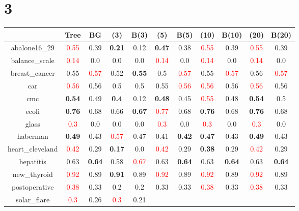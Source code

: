 \documentclass{article}%
\begin{document}
\section*{3}%
\begin{tabular}{c|cccccccccc}%
\hline%
&Tree&BG&(3)&B(3)&(5)&B(5)&(10)&B(10)&(20)&B(20)\\%
\hline%
abalone16\_29&\textcolor{red}{ 
0.55
}&0.39&\textbf{0.21}&0.12&\textbf{0.47}&0.38&\textcolor{red}{ 
0.55
}&0.39&\textcolor{red}{ 
0.55
}&0.39\\%
\hline%
balance\_scale&\textcolor{red}{ 
0.14
}&0.0&0.0&0.0&\textcolor{red}{ 
0.14
}&0.0&\textcolor{red}{ 
0.14
}&0.0&\textcolor{red}{ 
0.14
}&0.0\\%
\hline%
breast\_cancer&0.55&\textcolor{red}{ 
0.57
}&0.52&\textbf{0.55}&0.5&\textcolor{red}{ 
0.57
}&0.55&\textcolor{red}{ 
0.57
}&0.56&\textcolor{red}{ 
0.57
}\\%
\hline%
car&\textcolor{red}{ 
0.56
}&0.56&0.5&0.5&0.55&\textcolor{red}{ 
0.56
}&\textcolor{red}{ 
0.56
}&0.56&\textcolor{red}{ 
0.56
}&0.56\\%
\hline%
cmc&\textbf{0.54}&0.49&\textbf{0.4}&0.12&\textbf{0.48}&0.45&\textcolor{red}{ 
0.55
}&0.48&\textbf{0.54}&0.5\\%
\hline%
ecoli&\textbf{0.76}&0.68&0.66&\textbf{0.67}&\textcolor{red}{ 
0.77
}&0.68&\textbf{0.76}&0.68&\textbf{0.76}&0.68\\%
\hline%
glass&\textcolor{red}{ 
0.3
}&0.0&0.0&0.0&\textcolor{red}{ 
0.3
}&0.0&\textcolor{red}{ 
0.3
}&0.0&\textcolor{red}{ 
0.3
}&0.0\\%
\hline%
haberman&\textbf{0.49}&0.43&\textcolor{red}{ 
0.57
}&0.47&0.41&\textbf{0.42}&\textbf{0.47}&0.43&\textbf{0.49}&0.43\\%
\hline%
heart\_cleveland&\textcolor{red}{ 
0.42
}&0.29&\textbf{0.17}&0.0&\textcolor{red}{ 
0.42
}&0.29&\textbf{0.38}&0.29&\textcolor{red}{ 
0.42
}&0.29\\%
\hline%
hepatitis&0.63&\textbf{0.64}&0.58&\textcolor{red}{ 
0.67
}&0.63&\textbf{0.64}&0.63&\textbf{0.64}&0.63&\textbf{0.64}\\%
\hline%
new\_thyroid&\textcolor{red}{ 
0.92
}&0.89&\textbf{0.91}&0.89&\textcolor{red}{ 
0.92
}&0.89&\textcolor{red}{ 
0.92
}&0.89&\textcolor{red}{ 
0.92
}&0.89\\%
\hline%
postoperative&\textcolor{red}{ 
0.38
}&0.33&0.2&0.2&0.33&0.33&\textcolor{red}{ 
0.38
}&0.33&\textcolor{red}{ 
0.38
}&0.33\\%
\hline%
solar\_flare&\textcolor{red}{ 
0.3
}&0.26&\textcolor{red}{ 
0.3
}&0.21&\textcolor{red}{ 
}
\end{tabular}
\end{document}
